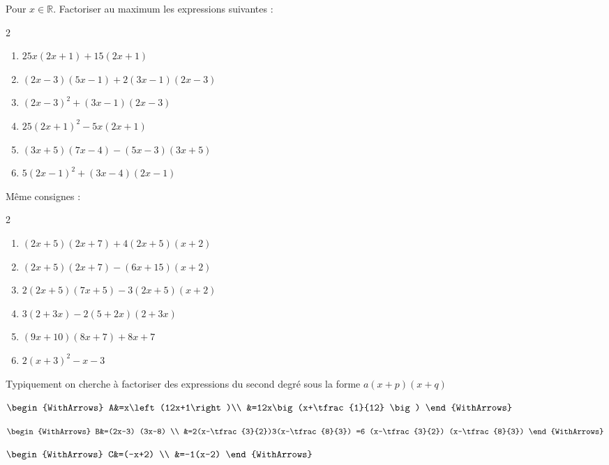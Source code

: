 \documentclass[main.tex]{subfiles}
\begin{document}
\begin{exercise}  \label{chap02:exo:factoriser:niveau1}
	Pour $x\in\mathbb{R}$. Factoriser au maximum les expressions suivantes : \vspace{-0.5em}
	\begin{multicols}{2} 
		\begin{enumerate}[label={$\Alph*(x)=$}, leftmargin=*] 
			\item$25x(2x+1)+15(2x+1)$ 
			\item $(2x-3)(5x-1)+2(3x-1)(2x-3) $
			\item $(2x-3)^2 +(3x-1)(2x-3)$
			\item$25(2x+1)^2-5x(2x+1)$    
			\item $(3x+5)(7x-4)-(5x-3)(3x+5)$ 
			\item$5(2x-1)^2+(3x-4)(2x-1)$
		\end{enumerate}
	\end{multicols} 
\end{exercise} 
\begin{exercise} \label{chap02:exo:factoriser:niveau2} 
  Même consignes : \vspace{-0.5em}
	\begin{multicols}{2} 
		\begin{enumerate}[label={$\Alph*(x)=$}, leftmargin=*]
			\item $(2x+5)(2x+7)+4(2x+5)(x+2)$ 
			\item $(2x+5)(2x+7)-(6x+15)(x+2)$
			\item $2(2x+5)(7x+5)-3(2x+5)(x+2)$ 
			\item $3(2+3x)-2(5+2x)(2+3x)$  
			\item $(9x + 10) (8x + 7) + 8x + 7$
			\item $2(x+3)^2-x-3$    
		\end{enumerate}
	\end{multicols} 
\end{exercise} 
\begin{eBox}
	Typiquement on cherche à factoriser des expressions du second degré sous la forme $a(x+p)(x+q)$ 
\end{eBox}
\begin{example}  \hfill\null
	
	\noindent
	\parbox{0.34\linewidth}{
		$\begin{WithArrows}
			A&=x\left(12x+1\right)\\
			&=12x\big(x+\tfrac{1}{12} \big) 
		\end{WithArrows}$
	}	 
	\parbox{0.45\linewidth}{
		$\begin{WithArrows}
			B&=(2x-3) (3x-8) \\
			&=2(x-\tfrac{3}{2})3(x-\tfrac{8}{3}) =6 (x-\tfrac{3}{2}) (x-\tfrac{8}{3})
		\end{WithArrows}$
	}\parbox{0.20\linewidth}{
		$\begin{WithArrows}
			C&=(-x+2) \\
			&=-1(x-2)
		\end{WithArrows}$ 
	} 
\end{example} 
\end{document}
